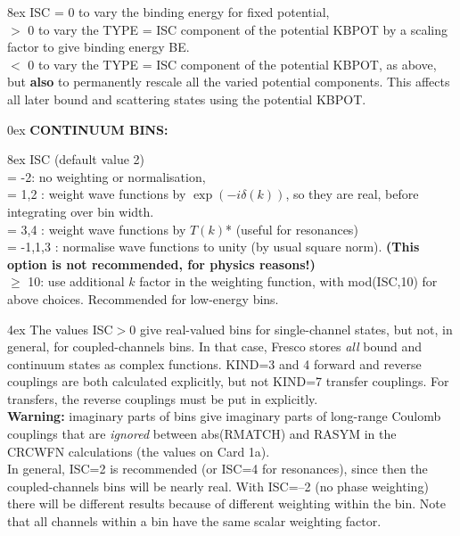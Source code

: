 \documentclass[11pt]{article}
\begin{document}
\hangindent 8ex  ISC
      = 0 to vary the binding energy for fixed potential,
\\  $>$ 0 to vary the TYPE = ISC component of the potential KBPOT
by a scaling factor to give binding energy BE.
\\  $<$ 0 to vary the TYPE = ISC component of the potential KBPOT,
as above, but {\bf also} to permanently rescale all the varied potential
components. This affects all later bound and scattering states using
the potential KBPOT.



\bigskip
%
\hangindent 0ex
{\bf CONTINUUM BINS:}


\hangindent 8ex  ISC   (default value 2)\\
      = -2: no weighting or normalisation,
\\  = 1,2 : weight wave functions by $\exp(-i\delta(k))$,
so they are real, before integrating over bin width.
\\  = 3,4 : weight wave functions by $T(k)$* (useful for resonances)
\\  = -1,1,3 : normalise wave functions to unity (by usual square norm).
{\bf (This option is not recommended, for physics reasons!)}
\\  $\geq$ 10: use additional $k$ factor in the weighting function, with
mod(ISC,10) for above choices. Recommended for low-energy  bins.

\hangindent 4ex
The values ISC$>$0 give real-valued bins for single-channel states,
but not, in general, for coupled-channels bins. In that case, Fresco stores
{\em all} bound and continuum states as complex functions.
KIND=3 and 4 forward and reverse couplings are both calculated
explicitly, but not KIND=7 transfer couplings. For transfers, the
reverse couplings must be put in explicitly.\\
{\bf Warning:} imaginary parts of bins give imaginary parts of long-range
Coulomb couplings that are {\em ignored} between abs(RMATCH) and RASYM
in the CRCWFN calculations (the values on Card 1a).\\
In general, ISC=2 is recommended (or ISC=4 for resonances), since then
the coupled-channels bins will be nearly real. With ISC=--2 (no phase weighting)
there will be  different results because of different weighting within the
bin. Note that all channels within a bin have the same scalar
weighting factor.



\bigskip
\end{document}
